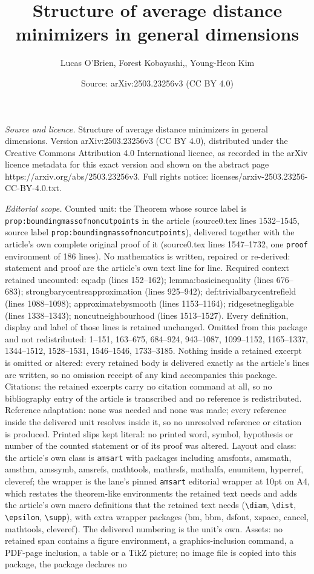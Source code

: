 \documentclass[10pt,a4paper]{amsart}
\title[Structure of average distance minimizers in general dimensio]{Structure of average distance minimizers in general dimensions}
\author{Lucas O'Brien, Forest Kobayashi,, Young-Heon Kim}
\date{Source: arXiv:2503.23256v3 (CC BY 4.0)}
\begin{document}
\maketitle

\noindent\emph{Source and licence.} Structure of average distance minimizers in general dimensions. Version arXiv:2503.23256v3 (CC BY 4.0), distributed under the Creative Commons Attribution 4.0 International licence, as recorded in the arXiv licence metadata for this exact version and shown on the abstract page https://arxiv.org/abs/2503.23256v3. Full rights notice: licenses/arxiv-2503.23256-CC-BY-4.0.txt.\par\smallskip

\noindent\textit{Editorial scope.} Counted unit: the Theorem whose source label is \texttt{prop:boundingmassofnoncutpoints} in the article (source0.tex lines 1532--1545, source label \texttt{prop:boundingmassofnoncutpoints}), delivered together with the article's own complete original proof of it (source0.tex lines 1547--1732, one \texttt{proof} environment of 186 lines). No mathematics is written, repaired or re-derived: statement and proof are the article's own text line for line. Required context retained uncounted: eq:adp (lines 152--162); lemma:basicinequality (lines 676--683); strongbarycentreapproximation (lines 925--942); def:trivialbarycentrefield (lines 1088--1098); approximatebysmooth (lines 1153--1164); ridgesetnegligable (lines 1338--1343); noncutneighbourhood (lines 1513--1527). Every definition, display and label of those lines is retained unchanged. Omitted from this package and not redistributed: 1--151, 163--675, 684--924, 943--1087, 1099--1152, 1165--1337, 1344--1512, 1528--1531, 1546--1546, 1733--3185. Nothing inside a retained excerpt is omitted or altered: every retained body is delivered exactly as the article's lines are written, so no omission receipt of any kind accompanies this package. Citations: the retained excerpts carry no citation command at all, so no bibliography entry of the article is transcribed and no reference is redistributed. Reference adaptation: none was needed and none was made; every reference inside the delivered unit resolves inside it, so no unresolved reference or citation is produced. Printed slips kept literal: no printed word, symbol, hypothesis or number of the counted statement or of its proof was altered. Layout and class: the article's own class is \texttt{amsart} with packages including amsfonts, amsmath, amsthm, amssymb, amsrefs, mathtools, mathrsfs, mathalfa, enumitem, hyperref, cleveref; the wrapper is the lane's pinned \texttt{amsart} editorial wrapper at 10pt on A4, which restates the theorem-like environments the retained text needs and adds the article's own macro definitions that the retained text needs (\texttt{\textbackslash diam}, \texttt{\textbackslash dist}, \texttt{\textbackslash epsilon}, \texttt{\textbackslash supp}), with extra wrapper packages (bm, bbm, dsfont, xspace, cancel, mathtools, cleveref). The delivered numbering is the unit's own. Assets: no retained span contains a figure environment, a graphics-inclusion command, a PDF-page inclusion, a table or a TikZ picture; no image file is copied into this package, the package declares no 
\end{document}

